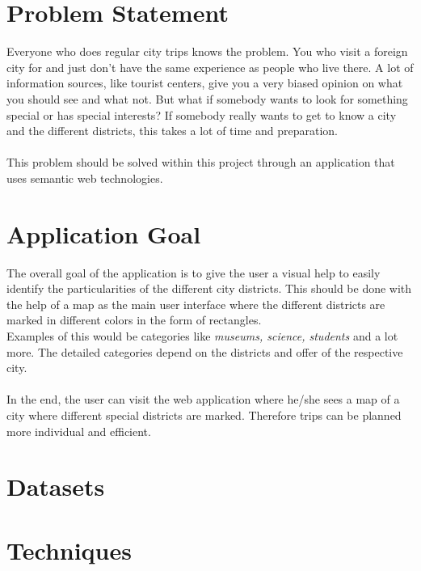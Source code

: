 \section{Problem Statement}
Everyone who does regular city trips knows the problem. You who visit a foreign city for and just don’t have the same experience as people who live there.  A lot of information sources, like tourist centers, give you a very biased opinion on what you should see and what not. But what if somebody wants to look for something special or has special interests? If somebody really wants to get to know a city and the different districts,  this takes a lot of time and preparation.
\\ \\
This problem should be solved within this project through an application that uses semantic web technologies.

\section{Application Goal}
The overall goal of the application is to give the user a visual help to easily identify the particularities of the different city districts. This should be done with the help of a map as the main user interface where the different districts are marked in different colors in the form of rectangles.
\\
Examples of this would be categories like \textit{museums, science, students} and a lot more. The detailed categories depend on the districts and offer of the respective city. 
\\ \\
In the end, the user can visit the web application where he/she sees a map of a city where different special districts are marked. Therefore trips can be planned more individual and efficient.

\section{Datasets}

\section{Techniques}

